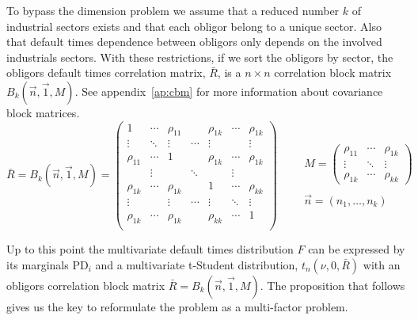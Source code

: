 \documentclass[11pt,fleqn]{book} %
\begin{document}
To bypass the dimension problem we assume that a reduced number $k$ of 
industrial sectors exists and that each obligor belong to a unique sector. 
Also that default times dependence between obligors only depends on the 
involved industrials sectors. With these restrictions, if we sort the 
obligors by sector, the obligors default times correlation matrix, $\bar{R}$, 
is a $n {\times} n$ correlation block matrix $B_k(\vec{n},\vec{1},M)$. See 
appendix~\ref{ap:cbm} for more information about covariance block matrices. 
\begin{displaymath}
	\bar{R} = B_k(\vec{n},\vec{1},M) = 
	\left(
	\begin{array}{ccccccc}
		1         & \cdots & \rho_{11} &        & \rho_{1k} & \cdots & \rho_{1k} \\
		\vdots    & \ddots & \vdots    & \cdots & \vdots    &        & \vdots    \\
		\rho_{11} & \cdots & 1         &        & \rho_{1k} & \cdots & \rho_{1k} \\
		
		          & \vdots &           & \ddots &           & \vdots &           \\
		
		\rho_{1k} & \cdots & \rho_{1k} &        & 1         & \cdots & \rho_{kk} \\
		\vdots    &        & \vdots    & \cdots & \vdots    & \ddots & \vdots    \\
		\rho_{1k} & \cdots & \rho_{1k} &        & \rho_{kk} & \cdots & 1         \\
	\end{array}
	\right)
	\qquad 
	\begin{array}{l}
		M = 
		\left(
		\begin{array}{ccc}
		\rho_{11} & \cdots & \rho_{1k} \\
		\vdots    & \ddots & \vdots    \\
		\rho_{1k} & \cdots & \rho_{kk}
		\end{array}
		\right) \\
		\\
		\vec{n} = (n_1,\dots,n_k)
	\end{array}
\end{displaymath}

Up to this point the multivariate default times distribution $F$ can 
be expressed by its marginals $\text{PD}_i$ and a multivariate t-Student 
distribution, $t_n(\nu,0,\bar{R})$ with an obligors correlation block 
matrix $\bar{R} = B_k(\vec{n},\vec{1},M)$. The proposition that follows 
gives us the key to reformulate the problem as a multi-factor problem.
\end{document}
